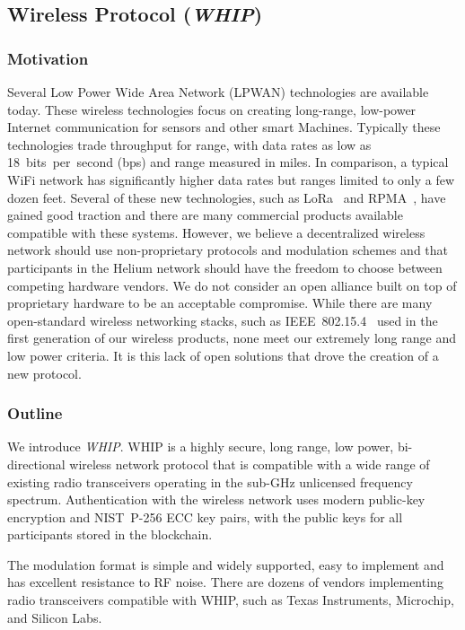 \documentclass[10pt, nonatbib, nocopyrightspace, reprint]{sigplanconf}
\begin{document}
\subsection{Wireless Protocol (\emph{WHIP})}\label{whip}

\subsubsection{Motivation}

Several Low Power Wide Area Network (LPWAN) technologies are available today. These wireless technologies focus on creating long-range, low-power Internet communication for sensors and other smart Machines. Typically these technologies trade throughput for range, with data rates as low as 18~bits~per~second (bps) and range measured in miles. In comparison, a typical WiFi network has significantly higher data rates but ranges limited to only a few dozen feet. Several of these new technologies, such as LoRa~\cite{lora} and RPMA~\cite{rpma}, have gained good traction and there are many commercial products available compatible with these systems. However, we believe a decentralized wireless network should use non-proprietary protocols and modulation schemes and that participants in the Helium network should have the freedom to choose between competing hardware vendors. We do not consider an open alliance built on top of proprietary hardware to be an acceptable compromise. While there are many open-standard wireless networking stacks, such as IEEE~802.15.4~\cite{ieee802_15_4} used in the first generation of our wireless products, none meet our extremely long range and low power criteria. It is this lack of open solutions that drove the creation of a new protocol.

\subsubsection{Outline}

We introduce \emph{WHIP}. WHIP is a highly secure, long range, low power, bi-directional wireless network protocol that is compatible with a wide range of existing radio transceivers operating in the sub-GHz unlicensed frequency spectrum. Authentication with the wireless network uses modern public-key encryption and NIST~P-256 ECC key pairs, with the public keys for all participants stored in the blockchain.

The modulation format is simple and widely supported, easy to implement and has excellent resistance to RF noise. There are dozens of vendors implementing radio transceivers compatible with WHIP, such as Texas Instruments, Microchip, and Silicon Labs.
\end{document}

